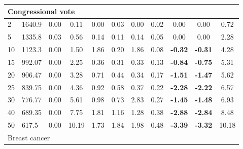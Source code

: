 {\begin{longtable}{@{}llccccccccc@{}}
\multicolumn{11}{l}{Congressional vote}                                                                                                                                                                         \\ \hline
\multicolumn{1}{l|}{2}  & \multicolumn{1}{l|}{1640.9}     & 0.00 & \multicolumn{1}{c|}{0.11}  & 0.00  & \multicolumn{1}{c|}{0.03} & 0.00  & \multicolumn{1}{c|}{0.02} & 0.00           & 0.00           & 0.72  \\
\multicolumn{1}{l|}{5}  & \multicolumn{1}{l|}{1335.8}     & 0.03 & \multicolumn{1}{c|}{0.56}  & 0.14  & \multicolumn{1}{c|}{0.11} & 0.14  & \multicolumn{1}{c|}{0.05} & 0.00           & 0.00           & 2.28  \\
\multicolumn{1}{l|}{10} & \multicolumn{1}{l|}{1123.3}     & 0.00 & \multicolumn{1}{c|}{1.50}  & 1.86  & \multicolumn{1}{c|}{0.20} & 1.86  & \multicolumn{1}{c|}{0.08} & \textbf{-0.32} & \textbf{-0.31} & 4.28  \\
\multicolumn{1}{l|}{15} & \multicolumn{1}{l|}{992.07}     & 0.00 & \multicolumn{1}{c|}{2.25}  & 0.36  & \multicolumn{1}{c|}{0.31} & 0.33  & \multicolumn{1}{c|}{0.13} & \textbf{-0.84} & \textbf{-0.75} & 5.31  \\
\multicolumn{1}{l|}{20} & \multicolumn{1}{l|}{906.47}     & 0.00 & \multicolumn{1}{c|}{3.28}  & 0.71  & \multicolumn{1}{c|}{0.44} & 0.34  & \multicolumn{1}{c|}{0.17} & \textbf{-1.51} & \textbf{-1.47} & 5.62  \\
\multicolumn{1}{l|}{25} & \multicolumn{1}{l|}{839.75}     & 0.00 & \multicolumn{1}{c|}{4.36}  & 0.92  & \multicolumn{1}{c|}{0.58} & 0.37  & \multicolumn{1}{c|}{0.22} & \textbf{-2.28} & \textbf{-2.22} & 6.57  \\
\multicolumn{1}{l|}{30} & \multicolumn{1}{l|}{776.77}     & 0.00 & \multicolumn{1}{c|}{5.61}  & 0.98  & \multicolumn{1}{c|}{0.73} & 2.83  & \multicolumn{1}{c|}{0.27} & \textbf{-1.45} & \textbf{-1.48} & 6.93  \\
\multicolumn{1}{l|}{40} & \multicolumn{1}{l|}{689.35}     & 0.00 & \multicolumn{1}{c|}{7.75}  & 1.81  & \multicolumn{1}{c|}{1.16} & 1.28  & \multicolumn{1}{c|}{0.38} & \textbf{-2.88} & \textbf{-2.84} & 8.48  \\
\multicolumn{1}{l|}{50} & \multicolumn{1}{l|}{617.5}      & 0.00 & \multicolumn{1}{c|}{10.19} & 1.73  & \multicolumn{1}{c|}{1.84} & 1.98  & \multicolumn{1}{c|}{0.48} & \textbf{-3.39} & \textbf{-3.32} & 10.18 \\ \hline
\multicolumn{11}{l}{Breast cancer}                                                                                                                                                                              \\ \hline

\end{longtable}}
